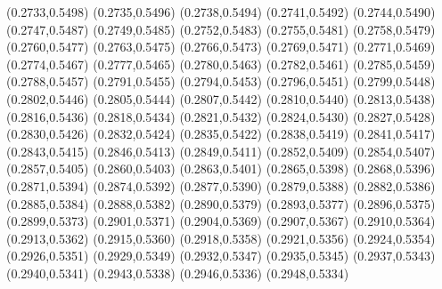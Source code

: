\PST@Filltriangle(0.2733,0.5498)
\PST@Filltriangle(0.2735,0.5496)
\PST@Filltriangle(0.2738,0.5494)
\PST@Filltriangle(0.2741,0.5492)
\PST@Filltriangle(0.2744,0.5490)
\PST@Filltriangle(0.2747,0.5487)
\PST@Filltriangle(0.2749,0.5485)
\PST@Filltriangle(0.2752,0.5483)
\PST@Filltriangle(0.2755,0.5481)
\PST@Filltriangle(0.2758,0.5479)
\PST@Filltriangle(0.2760,0.5477)
\PST@Filltriangle(0.2763,0.5475)
\PST@Filltriangle(0.2766,0.5473)
\PST@Filltriangle(0.2769,0.5471)
\PST@Filltriangle(0.2771,0.5469)
\PST@Filltriangle(0.2774,0.5467)
\PST@Filltriangle(0.2777,0.5465)
\PST@Filltriangle(0.2780,0.5463)
\PST@Filltriangle(0.2782,0.5461)
\PST@Filltriangle(0.2785,0.5459)
\PST@Filltriangle(0.2788,0.5457)
\PST@Filltriangle(0.2791,0.5455)
\PST@Filltriangle(0.2794,0.5453)
\PST@Filltriangle(0.2796,0.5451)
\PST@Filltriangle(0.2799,0.5448)
\PST@Filltriangle(0.2802,0.5446)
\PST@Filltriangle(0.2805,0.5444)
\PST@Filltriangle(0.2807,0.5442)
\PST@Filltriangle(0.2810,0.5440)
\PST@Filltriangle(0.2813,0.5438)
\PST@Filltriangle(0.2816,0.5436)
\PST@Filltriangle(0.2818,0.5434)
\PST@Filltriangle(0.2821,0.5432)
\PST@Filltriangle(0.2824,0.5430)
\PST@Filltriangle(0.2827,0.5428)
\PST@Filltriangle(0.2830,0.5426)
\PST@Filltriangle(0.2832,0.5424)
\PST@Filltriangle(0.2835,0.5422)
\PST@Filltriangle(0.2838,0.5419)
\PST@Filltriangle(0.2841,0.5417)
\PST@Filltriangle(0.2843,0.5415)
\PST@Filltriangle(0.2846,0.5413)
\PST@Filltriangle(0.2849,0.5411)
\PST@Filltriangle(0.2852,0.5409)
\PST@Filltriangle(0.2854,0.5407)
\PST@Filltriangle(0.2857,0.5405)
\PST@Filltriangle(0.2860,0.5403)
\PST@Filltriangle(0.2863,0.5401)
\PST@Filltriangle(0.2865,0.5398)
\PST@Filltriangle(0.2868,0.5396)
\PST@Filltriangle(0.2871,0.5394)
\PST@Filltriangle(0.2874,0.5392)
\PST@Filltriangle(0.2877,0.5390)
\PST@Filltriangle(0.2879,0.5388)
\PST@Filltriangle(0.2882,0.5386)
\PST@Filltriangle(0.2885,0.5384)
\PST@Filltriangle(0.2888,0.5382)
\PST@Filltriangle(0.2890,0.5379)
\PST@Filltriangle(0.2893,0.5377)
\PST@Filltriangle(0.2896,0.5375)
\PST@Filltriangle(0.2899,0.5373)
\PST@Filltriangle(0.2901,0.5371)
\PST@Filltriangle(0.2904,0.5369)
\PST@Filltriangle(0.2907,0.5367)
\PST@Filltriangle(0.2910,0.5364)
\PST@Filltriangle(0.2913,0.5362)
\PST@Filltriangle(0.2915,0.5360)
\PST@Filltriangle(0.2918,0.5358)
\PST@Filltriangle(0.2921,0.5356)
\PST@Filltriangle(0.2924,0.5354)
\PST@Filltriangle(0.2926,0.5351)
\PST@Filltriangle(0.2929,0.5349)
\PST@Filltriangle(0.2932,0.5347)
\PST@Filltriangle(0.2935,0.5345)
\PST@Filltriangle(0.2937,0.5343)
\PST@Filltriangle(0.2940,0.5341)
\PST@Filltriangle(0.2943,0.5338)
\PST@Filltriangle(0.2946,0.5336)
\PST@Filltriangle(0.2948,0.5334)
